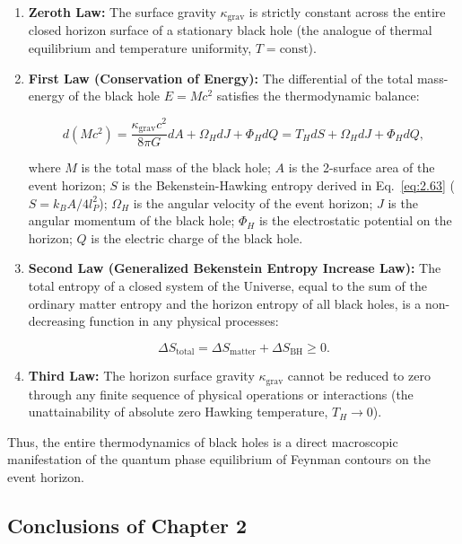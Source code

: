 \documentclass[11pt,a4paper]{article}
\theoremstyle{definition}
\begin{document}
\begin{enumerate}
\item \textbf{Zeroth Law:} The surface gravity $\kappa_{\text{grav}}$ is strictly constant across the entire closed horizon surface of a stationary black hole (the analogue of thermal equilibrium and temperature uniformity, $T = \text{const}$).

\item \textbf{First Law (Conservation of Energy):}  
The differential of the total mass-energy of the black hole $E = M c^2$ satisfies the thermodynamic balance:

\begin{equation}\label{eq:2.70}\tag{2.70}
d(M c^2) = \frac{\kappa_{\text{grav}} c^2}{8\pi G} dA + \Omega_H dJ + \Phi_H dQ = T_H dS + \Omega_H dJ + \Phi_H dQ,
\end{equation}

where $M$ is the total mass of the black hole;  
$A$ is the 2-surface area of the event horizon;  
$S$ is the Bekenstein-Hawking entropy derived in Eq.~\eqref{eq:2.63} ($S = k_B A / 4l_P^2$);  
$\Omega_H$ is the angular velocity of the event horizon;  
$J$ is the angular momentum of the black hole;  
$\Phi_H$ is the electrostatic potential on the horizon;  
$Q$ is the electric charge of the black hole.

\item \textbf{Second Law (Generalized Bekenstein Entropy Increase Law):}  
The total entropy of a closed system of the Universe, equal to the sum of the ordinary matter entropy and the horizon entropy of all black holes, is a non-decreasing function in any physical processes:

\begin{equation}\label{eq:2.71}\tag{2.71}
\Delta S_{\text{total}} = \Delta S_{\text{matter}} + \Delta S_{\text{BH}} \ge 0.
\end{equation}

\item \textbf{Third Law:} The horizon surface gravity $\kappa_{\text{grav}}$ cannot be reduced to zero through any finite sequence of physical operations or interactions (the unattainability of absolute zero Hawking temperature, $T_H \to 0$).
\end{enumerate}

Thus, the entire thermodynamics of black holes is a direct macroscopic manifestation of the quantum phase equilibrium of Feynman contours on the event horizon.

\subsection{Conclusions of Chapter 2}\label{sec:2.7}
\end{document}
